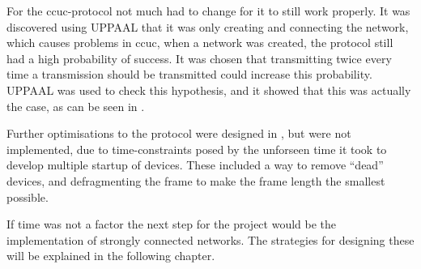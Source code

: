 For the \acrshort{ccuc}-protocol not much had to change for it to still work properly.
It was discovered using UPPAAL that it was only creating and connecting the network, which causes problems in \acrshort{ccuc}, when a network was created, the protocol still had a high probability of success.
It was chosen that transmitting twice every time a transmission should be transmitted could increase this probability.
UPPAAL was used to check this hypothesis, and it showed that this was actually the case, as can be seen in .

Further optimisations to the protocol were designed in , but were not implemented, due to time-constraints posed by the unforseen time it took to develop multiple startup of devices.
These included a way to remove \enquote{dead} devices, and defragmenting the frame to make the frame length the smallest possible.

\bigskip \noindent
If time was not a factor the next step for the project would be the implementation of strongly connected networks.
The strategies for designing these will be explained in the following chapter.